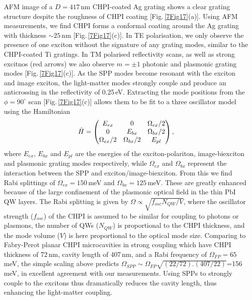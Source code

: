 AFM image of a $D=417$\,nm CHPI-coated Ag grating shows a clear grating structure despite the roughness of CHPI coating [Fig.\,\ref{7Fig17}(a)]. Using AFM measurements, we find CHPI forms a conformal coating around the Ag grating with thickness $\sim25$\,nm [Fig.\,\ref{7Fig17}(c)]. In TE polarisation, we only observe the presence of one exciton without the signature of any grating modes, similar to the CHPI-coated Ti gratings. In TM polarised reflectivity scans, as well as strong excitnos (red arrows) we also observe $m=\pm1$ photonic and plasmonic grating modes [Fig.\,\ref{7Fig17}(c)].  As the SPP modes become resonant with the exciton and image exciton, the light-matter modes strongly couple and produce an anticrossing in the reflectivity of 0.25\,eV. Extracting the mode positions from the $\phi=90^{\circ}$ scan [Fig.\,\ref{7Fig17}(c)] allows them to be fit to a three oscillator model using the Hamiltonian
\begin{equation}
\centering 
\hat{H}=\left( \begin{matrix} 
E_{ex} & 0 & \Omega_{ex}/2 \\
0 & E_{bx} & \Omega_{bx}/2 \\
\Omega_{ex}/2 & \Omega_{bx}/2 & E_{pl} 
\end{matrix} \right) ,
\end{equation}
where $E_{ex}$, $E_{bx}$ and $E_{pl}$ are the energies of the exciton-polariton, image-biexciton and plasmonic grating modes respectively, while $\Omega_{ex}$ and $\Omega_{bx}$ represent the interaction between the SPP and exciton/image-biexciton. From this we find Rabi splittings of $\Omega_{ex}=150$\,meV and $\Omega_{bx}=125$\,meV. 
These are greatly enhanced because of the large confinement of the plasmonic optical field in the thin PbI QW layers. The Rabi splitting is given by $\Omega \propto \sqrt{f_{osc} N_{QW}/V}$, where the oscillator strength ($f_{osc}$) of the CHPI is assumed to be similar for coupling to photons or plasmons, the number of QWs ($N_{QW}$) is proportional to the CHPI thickness, and the mode volume ($V$) is here proportional to the optical mode size. Comparing to Fabry-Perot planar CHPI microcavities in strong coupling \cite{Pradeesh2009b} which have CHPI thickness of 72\,nm, cavity length of 407\,nm, and a Rabi frequency of $\Omega_{FP}=65$\,meV, the simple scaling above predicts $\Omega_{SPP} \sim \Omega_{FP} \sqrt{(22/72).(407/22)}$=156\,meV, in excellent agreement with our measurements. Using SPPs to strongly couple to the excitons thus dramatically reduces the cavity length, thus enhancing the light-matter coupling.


